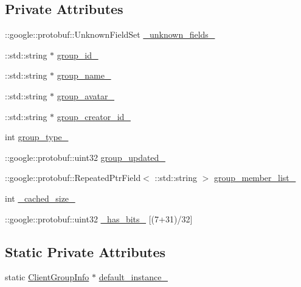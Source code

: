 \subsection*{Private Attributes}
\begin{DoxyCompactItemize}
\item 
\+::google\+::protobuf\+::\+Unknown\+Field\+Set \hyperlink{class_i_m_1_1_base_define_1_1_client_group_info_ac894238ef8be4b9c950abab3a6600523}{\+\_\+unknown\+\_\+fields\+\_\+}
\item 
\+::std\+::string $\ast$ \hyperlink{class_i_m_1_1_base_define_1_1_client_group_info_ad511dd6691fc822a9c68963bae7e4c8b}{group\+\_\+id\+\_\+}
\item 
\+::std\+::string $\ast$ \hyperlink{class_i_m_1_1_base_define_1_1_client_group_info_ac3c5367e1b2ed5b116dbd082e288a98f}{group\+\_\+name\+\_\+}
\item 
\+::std\+::string $\ast$ \hyperlink{class_i_m_1_1_base_define_1_1_client_group_info_ab7c51881521620cca7fb2c648b243d49}{group\+\_\+avatar\+\_\+}
\item 
\+::std\+::string $\ast$ \hyperlink{class_i_m_1_1_base_define_1_1_client_group_info_a93d7f1b171368952742702b0c023cb9a}{group\+\_\+creator\+\_\+id\+\_\+}
\item 
int \hyperlink{class_i_m_1_1_base_define_1_1_client_group_info_a6fcfea286cd3f181f820690eed6af14b}{group\+\_\+type\+\_\+}
\item 
\+::google\+::protobuf\+::uint32 \hyperlink{class_i_m_1_1_base_define_1_1_client_group_info_a8d344c0cf2c663e1bcd7f34cf6bbed64}{group\+\_\+updated\+\_\+}
\item 
\+::google\+::protobuf\+::\+Repeated\+Ptr\+Field$<$ \+::std\+::string $>$ \hyperlink{class_i_m_1_1_base_define_1_1_client_group_info_abe1992fc84244d0b13feb4c62120e574}{group\+\_\+member\+\_\+list\+\_\+}
\item 
int \hyperlink{class_i_m_1_1_base_define_1_1_client_group_info_a5338fd88e39f34af884a66c0969ffe15}{\+\_\+cached\+\_\+size\+\_\+}
\item 
\+::google\+::protobuf\+::uint32 \hyperlink{class_i_m_1_1_base_define_1_1_client_group_info_aa064def3502200d8fe3b9a1c197a4993}{\+\_\+has\+\_\+bits\+\_\+} \mbox{[}(7+31)/32\mbox{]}
\end{DoxyCompactItemize}
\subsection*{Static Private Attributes}
\begin{DoxyCompactItemize}
\item 
static \hyperlink{class_i_m_1_1_base_define_1_1_client_group_info}{Client\+Group\+Info} $\ast$ \hyperlink{class_i_m_1_1_base_define_1_1_client_group_info_a76be488f657d967d4f7d06f7463ba984}{default\+\_\+instance\+\_\+}
\end{DoxyCompactItemize}
